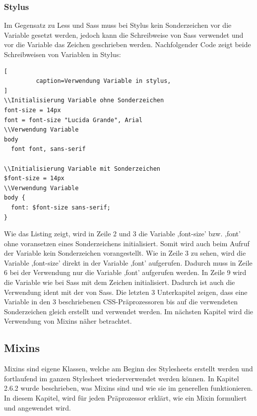 \subsubsection{Stylus}
Im Gegensatz zu Less und Sass muss bei Stylus kein Sonderzeichen vor die Variable gesetzt werden, jedoch kann die Schreibweise von Sass verwendet und vor die Variable das Zeichen \glqq{\$}\grqq{} geschrieben werden. Nachfolgender Code zeigt beide Schreibweisen von Variablen in Stylus:
\begin{lstlisting}[
         caption=Verwendung Variable in stylus,
]
\\Initialisierung Variable ohne Sonderzeichen
font-size = 14px
font = font-size "Lucida Grande", Arial
\\Verwendung Variable
body
  font font, sans-serif

\\Initialisierung Variable mit Sonderzeichen
$font-size = 14px
\\Verwendung Variable
body {
  font: $font-size sans-serif;
}
\end{lstlisting}\autocite[]{LearnBoost.2010}
Wie das Listing zeigt, wird in Zeile 2 und 3 die Variable ,font-size' bzw. ,font' ohne voransetzen eines Sonderzeichens initialisiert. Somit wird auch beim Aufruf der Variable kein Sonderzeichen vorangestellt. Wie in Zeile 3 zu sehen, wird die Variable ,font-size' direkt in der Variable ,font' aufgerufen. Dadurch muss in Zeile 6 bei der Verwendung nur die Variable ,font' aufgerufen werden.\newline
In Zeile 9 wird die Variable wie bei Sass mit dem Zeichen \glqq{\$}\grqq{} initialisiert. Dadurch ist auch die Verwendung ident mit der von Sass.\newline\newline
Die letzten 3 Unterkapitel zeigen, dass eine Variable in den 3 beschriebenen CSS-Präprozessoren bis auf die verwendeten Sonderzeichen gleich erstellt und verwendet werden.\newline
Im nächsten Kapitel wird die Verwendung von Mixins näher betrachtet.
\newpage
\subsection{Mixins}
Mixins sind eigene Klassen, welche am Beginn des Stylesheets erstellt werden und fortlaufend im ganzen Stylesheet wiederverwendet werden können. \newline
In Kapitel 2.6.2 wurde beschrieben, was Mixins sind und wie sie im generellen funktionieren. In diesem Kapitel, wird für jeden Präprozessor erklärt, wie ein Mixin formuliert und angewendet wird.
